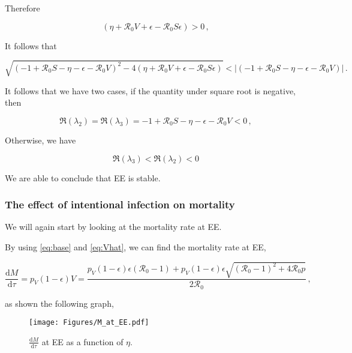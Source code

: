\documentclass[12pt]{article}
\newcommand\dbyd[2]{\frac{\mathrm d{#1}}{\mathrm d{#2}}}
\newcommand{\R}{\mathcal{R}}
\newcommand{\pmV}{p_{V}}
\begin{document}
Therefore
\begin{linenomath*}
\begin{equation}
(\eta+\R_0 V+\epsilon-\R_0 S\epsilon)>0\,,
\end{equation}
\end{linenomath*}

It follows that
\begin{linenomath*}
\begin{equation}
\sqrt{(-1+\R_0 S-\eta-\epsilon-\R_0 V)^2-4(\eta+\R_0 V+\epsilon-\R_0 S\epsilon)}<|(-1+\R_0 S-\eta-\epsilon-\R_0 V)|\,.
\end{equation}
\end{linenomath*}

It follows that we have two cases, if the quantity under square root is negative, then
\begin{linenomath*}
\begin{equation}
\Re(\lambda_2)=\Re(\lambda_3)=-1+\R_0 S-\eta-\epsilon-\R_0 V<0\,,
\end{equation}
\end{linenomath*}

Otherwise, we have
\begin{linenomath*}
\begin{equation}
\Re(\lambda_3)<\Re(\lambda_2)<0
\end{equation}
\end{linenomath*}

We are able to conclude that EE is stable.

\subsubsection{The effect of intentional infection on mortality}
We will again start by looking at the mortality rate at EE.

By using \autoref{eq:base} and \autoref{eq:Vhat}, we can find the mortality rate at EE,
\begin{linenomath*}
\begin{equation}
\dbyd{M}{\tau}=\pmV(1-\epsilon)V=\frac{\pmV(1-\epsilon)\epsilon(\R_0 -1)+ \pmV(1-\epsilon)\epsilon \sqrt{(\R_0-1)^2+4\R_0 p}}{2\R_0}\,, \label{eq:dMdt}
\end{equation}
\end{linenomath*}
as shown the following graph,
\begin{figure}[H]
  \centering
  \texttt{[image: Figures/M\_at\_EE.pdf]}
  \caption{$\dbyd{M}{\tau}$ at EE as a function of $\eta$.}
\end{figure}
\end{document}
